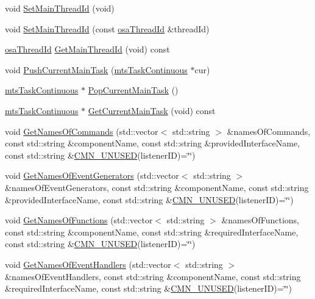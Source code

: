 \begin{DoxyCompactItemize}
void \hyperlink{classmts_manager_local_a06392031b4d896336b39a92c44879ad8}{Set\+Main\+Thread\+Id} (void)
\item 
void \hyperlink{classmts_manager_local_a96026c78f75e1a09b7760e7dbcccccf1}{Set\+Main\+Thread\+Id} (const \hyperlink{classosa_thread_id}{osa\+Thread\+Id} \&thread\+Id)
\item 
\hyperlink{classosa_thread_id}{osa\+Thread\+Id} \hyperlink{classmts_manager_local_aef3de1de53d9968b54fc42353b673b11}{Get\+Main\+Thread\+Id} (void) const 
\item 
void \hyperlink{classmts_manager_local_a209ed363a66764defa7dd0416f2202a7}{Push\+Current\+Main\+Task} (\hyperlink{classmts_task_continuous}{mts\+Task\+Continuous} $\ast$cur)
\item 
\hyperlink{classmts_task_continuous}{mts\+Task\+Continuous} $\ast$ \hyperlink{classmts_manager_local_a3e5de6ff1d38576e2e3bb2c2db744b3d}{Pop\+Current\+Main\+Task} ()
\item 
\hyperlink{classmts_task_continuous}{mts\+Task\+Continuous} $\ast$ \hyperlink{classmts_manager_local_ada43572267d4d03144937ef05c006f25}{Get\+Current\+Main\+Task} (void) const 
\item 
void \hyperlink{classmts_manager_local_a9214b281609da7c551470ba57b84bdb1}{Get\+Names\+Of\+Commands} (std\+::vector$<$ std\+::string $>$ \&names\+Of\+Commands, const std\+::string \&component\+Name, const std\+::string \&provided\+Interface\+Name, const std\+::string \&\hyperlink{cmn_portability_8h_a021894e2626935fa2305434b1e893ff6}{C\+M\+N\+\_\+\+U\+N\+U\+S\+E\+D}(listener\+I\+D)=\char`\"{}\char`\"{})
\item 
void \hyperlink{classmts_manager_local_a493fc29ed542912818821bc72d774ce6}{Get\+Names\+Of\+Event\+Generators} (std\+::vector$<$ std\+::string $>$ \&names\+Of\+Event\+Generators, const std\+::string \&component\+Name, const std\+::string \&provided\+Interface\+Name, const std\+::string \&\hyperlink{cmn_portability_8h_a021894e2626935fa2305434b1e893ff6}{C\+M\+N\+\_\+\+U\+N\+U\+S\+E\+D}(listener\+I\+D)=\char`\"{}\char`\"{})
\item 
void \hyperlink{classmts_manager_local_ab868a0aedf66bc7504876c96662eaa7a}{Get\+Names\+Of\+Functions} (std\+::vector$<$ std\+::string $>$ \&names\+Of\+Functions, const std\+::string \&component\+Name, const std\+::string \&required\+Interface\+Name, const std\+::string \&\hyperlink{cmn_portability_8h_a021894e2626935fa2305434b1e893ff6}{C\+M\+N\+\_\+\+U\+N\+U\+S\+E\+D}(listener\+I\+D)=\char`\"{}\char`\"{})
\item 
void \hyperlink{classmts_manager_local_a6eecd5e2e2a7c7334d841d754756c1d1}{Get\+Names\+Of\+Event\+Handlers} (std\+::vector$<$ std\+::string $>$ \&names\+Of\+Event\+Handlers, const std\+::string \&component\+Name, const std\+::string \&required\+Interface\+Name, const std\+::string \&\hyperlink{cmn_portability_8h_a021894e2626935fa2305434b1e893ff6}{C\+M\+N\+\_\+\+U\+N\+U\+S\+E\+D}(listener\+I\+D)=\char`\"{}\char`\"{})

\end{DoxyCompactItemize}
